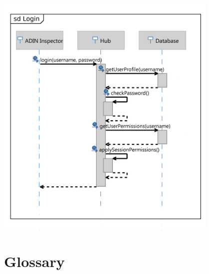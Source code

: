 \documentclass[twoside, english, final]{Pflichtenheft}
\begin{document}
\begin{center}
\includegraphics[width=0.8\textwidth]{Images/adin-login-seq.png}
\label{fig:adin-login-seq}
\end{center}

\section{Glossary}
\printglossary[title=,toctitle=]



\printbibliography[heading=bibintoc]
\end{document}
